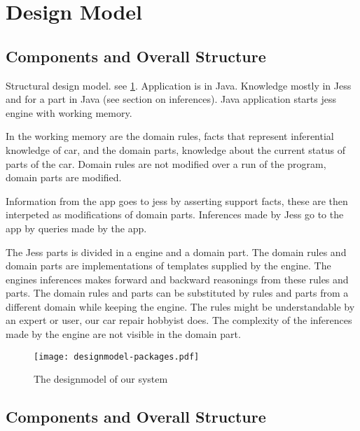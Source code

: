 \section{Design Model}


\subsection{Components and Overall Structure}
Structural design model.
see \ref{fig:designmodel1}. Application is in Java. Knowledge mostly in Jess and
for a part in Java (see section on inferences). Java application starts jess
engine with working memory.

In the working memory are the domain rules, facts
that represent inferential knowledge of car, and the domain parts, knowledge
about the current status of parts of the car. Domain rules are not modified over
a run of the program, domain parts are modified.

Information from the app goes to jess by asserting
support facts, these are then interpeted as modifications of domain parts.
Inferences made by Jess go to the app by queries made by the app.

The Jess parts is divided in a engine and a domain part. The domain rules and
domain parts are implementations of templates supplied by the engine. The
engines inferences makes forward and backward reasonings from these rules and
parts. The domain rules and parts can be substituted by rules and parts from a
different domain while keeping the engine. The rules might be understandable by an
expert or user, our car repair hobbyist does. The complexity of the inferences
made by the engine are not visible in the domain part.

\begin{figure}[htbp]
    \centering
    \texttt{[image: designmodel-packages.pdf]}
    \caption{The designmodel of our system}
    \label{fig:designmodel1}
\end{figure}

\subsection{Components and Overall Structure}



